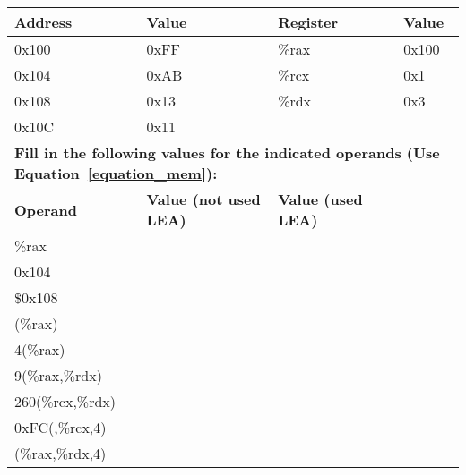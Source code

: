 \begin{table}[h!]
    \centering
    \small
    \renewcommand{\arraystretch}{1.2}
    \begin{tabular}{ll ll}
        \toprule
        \textbf{Address} & \textbf{Value} & \textbf{Register} & \textbf{Value} \\
        \midrule
        0x100 & 0xFF  & \%rax & 0x100 \\
        0x104 & 0xAB  & \%rcx & 0x1 \\
        0x108 & 0x13  & \%rdx & 0x3 \\
        0x10C & 0x11  & & \\
        \midrule
        \multicolumn{4}{l}{\textbf{Fill in the following values for the indicated 
        operands (Use Equation~\ref{equation_mem}):}} \\
        \midrule
        \textbf{Operand} & \textbf{Value (not used LEA)} & \textbf{Value (used LEA)} \\
        \midrule
        \%rax & \underline{\hspace{3cm}} & \underline{\hspace{3cm}} \\
        0x104 & \underline{\hspace{3cm}} & \underline{\hspace{3cm}} \\
        \$0x108 & \underline{\hspace{3cm}} & \underline{\hspace{3cm}} \\
        (\%rax) & \underline{\hspace{3cm}} & \underline{\hspace{3cm}} \\
        4(\%rax) & \underline{\hspace{3cm}} & \underline{\hspace{3cm}} \\
        9(\%rax,\%rdx) & \underline{\hspace{3cm}} & \underline{\hspace{3cm}} \\
        260(\%rcx,\%rdx) & \underline{\hspace{3cm}} & \underline{\hspace{3cm}} \\
        0xFC(,\%rcx,4) & \underline{\hspace{3cm}} & \underline{\hspace{3cm}} \\
        (\%rax,\%rdx,4) & \underline{\hspace{3cm}} & \underline{\hspace{3cm}} \\
        \bottomrule
    \end{tabular}
\end{table}

